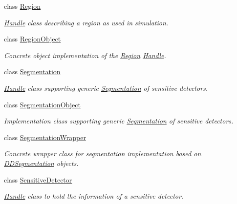 \begin{DoxyCompactItemize}
class \hyperlink{class_d_d4hep_1_1_geometry_1_1_region}{Region}
\begin{DoxyCompactList}\small\item\em \hyperlink{class_d_d4hep_1_1_handle}{Handle} class describing a region as used in simulation. \end{DoxyCompactList}\item 
class \hyperlink{class_d_d4hep_1_1_geometry_1_1_region_object}{Region\+Object}
\begin{DoxyCompactList}\small\item\em Concrete object implementation of the \hyperlink{class_d_d4hep_1_1_geometry_1_1_region}{Region} \hyperlink{class_d_d4hep_1_1_handle}{Handle}. \end{DoxyCompactList}\item 
class \hyperlink{class_d_d4hep_1_1_geometry_1_1_segmentation}{Segmentation}
\begin{DoxyCompactList}\small\item\em \hyperlink{class_d_d4hep_1_1_handle}{Handle} class supporting generic \hyperlink{class_d_d4hep_1_1_geometry_1_1_segmentation}{Segmentation} of sensitive detectors. \end{DoxyCompactList}\item 
class \hyperlink{class_d_d4hep_1_1_geometry_1_1_segmentation_object}{Segmentation\+Object}
\begin{DoxyCompactList}\small\item\em Implementation class supporting generic \hyperlink{class_d_d4hep_1_1_geometry_1_1_segmentation}{Segmentation} of sensitive detectors. \end{DoxyCompactList}\item 
class \hyperlink{class_d_d4hep_1_1_geometry_1_1_segmentation_wrapper}{Segmentation\+Wrapper}
\begin{DoxyCompactList}\small\item\em Concrete wrapper class for segmentation implementation based on \hyperlink{namespace_d_d4hep_1_1_d_d_segmentation}{D\+D\+Segmentation} objects. \end{DoxyCompactList}\item 
class \hyperlink{class_d_d4hep_1_1_geometry_1_1_sensitive_detector}{Sensitive\+Detector}
\begin{DoxyCompactList}\small\item\em \hyperlink{class_d_d4hep_1_1_handle}{Handle} class to hold the information of a sensitive detector. \end{DoxyCompactList}\item 

\end{DoxyCompactItemize}
